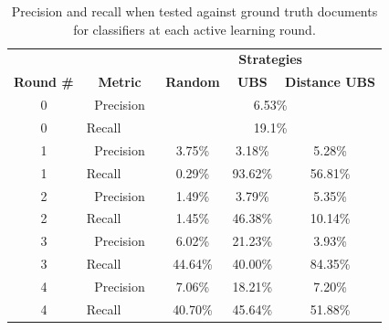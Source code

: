 \begin{table}[ht!]
\centering
\caption{Precision and recall when tested against ground truth documents for classifiers at each active learning round.\label{tab:pr_table}
}
\vspace{2ex}
\setlength\tabcolsep{4pt}
\begin{tabular}{|c|c|c|c|c|}
\hline
& & \multicolumn{3}{c|}{\textbf{Strategies}} \\
 \textbf{Round \#} & \textbf{Metric} & \textbf{Random} & \textbf{UBS}  & \textbf{Distance UBS}  \\
\hline
0 & Precision &        \multicolumn{3}{c|}{6.53\%} \\
0 & Recall\ \ \ \ \ &               \multicolumn{3}{c|}{19.1\%} \\
\hline
1 & Precision     & 3.75\%       &      3.18\%      &  5.28\% \\
1 & Recall\ \ \ \ \ & 0.29\%      &   93.62\%     &  56.81\% \\
\hline
2& Precision      & 1.49\%           &      3.79\%      &  5.35\% \\
2& Recall\ \ \ \ \ & 1.45\%           &    46.38\%      &  10.14\% \\
\hline
3 & Precision      & 6.02\%              &    21.23\%      &  3.93\% \\
3 & Recall\ \ \ \ \ & 44.64\%            &    40.00\%      &  84.35\%  \\
\hline
4& Precision     & 7.06\%          &    18.21\%      &  7.20\% \\
4& Recall\ \ \ \ \ & 40.70\%         &     45.64\%     &  51.88\% \\
\hline
\end{tabular}
\end{table}



